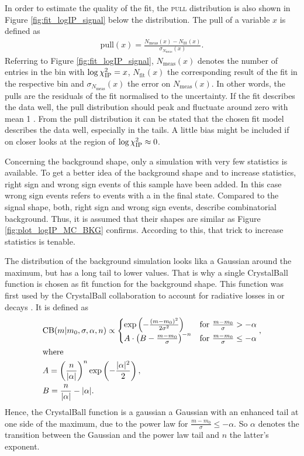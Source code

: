 In order to estimate the quality of the fit, the \textsc{pull} distribution is also shown in Figure \ref{fig:fit_logIP_signal} below the \logIP distribution.
The pull of a variable $x$ is defined as
\begin{align}
    \text{pull}(x) = \frac{N_\text{meas}(x)-N_\text{fit}(x)}{\sigma_{N_\text{meas}}(x)}.  \label{eq:pull}
\end{align}
Referring to Figure \ref{fig:fit_logIP_signal}, $N_\text{meas}(x)$ denotes the number of entries in the bin with $\log \chi^2_{\text{IP}} = x$, $N_\text{fit}(x)$ the corresponding result of the fit in the respective bin and $\sigma_{N_\text{meas}}(x)$ the error on $N_\text{meas}(x)$.
In other words, the pulls are the residuals of the fit normalised to the uncertainty.
If the fit describes the data well, the pull distribution should peak and fluctuate around zero with mean 1 \cite{Pulls}.
From the pull distribution it can be stated that the chosen fit model describes the data well, especially in the tails.
A little bias might be included if on closer looks at the region of $\log \chi^2_{\text{IP}} \approx 0$.

Concerning the \logIP background shape, only a simulation with very few statistics is available.
To get a better idea of the background \logIP shape and to increase statistics, right sign and wrong sign events of this sample have been added.
In this case wrong sign events refers to events with a \Lc\mup in the final state.
Compared to the signal \logIP shape, both, right sign and wrong sign events, describe combinatorial background.
Thus, it is assumed that their \logIP shapes are similar as Figure \ref{fig:plot_logIP_MC_BKG} confirms. 
According to this, that trick to increase statistics is tenable.

The \logIP distribution of the background simulation looks lika a Gaussian around the maximum, but has a long tail to lower \logIP values.
That is why a single CrystalBall function is chosen as fit function for the \logIP background shape. 
This function was first used by the CrystalBall collaboration to account for radiative losses in \jpsi or \psitwos decays \cite{CrystalBall}. 
It is defined as 
\begin{align}
    &\text{CB}(m|m_0, \sigma, \alpha, n) \propto
    \begin{cases}
        \exp \left(-\frac{(m-m_0)^2}{2\sigma^2}\right)     & \text{for } \frac{m-m_0}{\sigma} > -\alpha \\
        A \cdot \left(B - \frac{m-m_0}{\sigma}\right)^{-n} & \text{for } \frac{m-m_0}{\sigma} \leq -\alpha
    \end{cases}, \\
    &\text{where} \\
    &A = \left(\frac{n}{|\alpha|}\right)^n \exp\left(-\frac{|\alpha|^2}{2}\right), \\
    &B = \frac{n}{|\alpha|} - |\alpha|.
\end{align}
Hence, the CrystalBall function is a gaussian a Gaussian with an enhanced tail at one side of the maximum, due to the power law for $\frac{m-m_0}{\sigma} \leq -\alpha$.
So $\alpha$ denotes the transition between the Gaussian and the power law tail and $n$ the latter's exponent.

